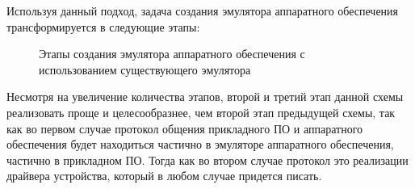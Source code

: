 Используя данный подход, задача создания эмулятора аппаратного обеспечения трансформируется в следующие этапы:
\begin{figure}[!htbp]
    \centering
    \caption{Этапы создания эмулятора аппаратного обеспечения с использованием существующего эмулятора}\label{fig:emu-creation-pro}
\end{figure}


Несмотря на увеличение количества этапов, второй и третий этап данной схемы реализовать проще и
целесообразнее, чем второй этап предыдущей схемы, так как во первом случае
протокол общения прикладного ПО и аппаратного обеспечения будет находиться частично в
эмуляторе аппаратного обеспечения, частично в прикладном ПО.
Тогда как во втором случае протокол это реализации драйвера устройства, который в любом случае придется писать.

